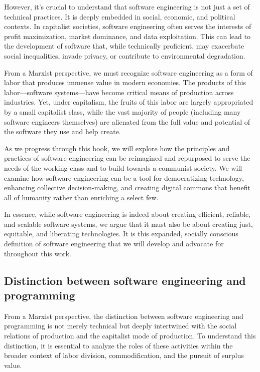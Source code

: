 \begin{refsection}
\begin{multicols}{2}
{However, it's crucial to understand that software engineering is not just a set of technical practices. It is deeply embedded in social, economic, and political contexts. In capitalist societies, software engineering often serves the interests of profit maximization, market dominance, and data exploitation. This can lead to the development of software that, while technically proficient, may exacerbate social inequalities, invade privacy, or contribute to environmental degradation.

From a Marxist perspective, we must recognize software engineering as a form of labor that produces immense value in modern economies. The products of this labor—software systems—have become critical means of production across industries. Yet, under capitalism, the fruits of this labor are largely appropriated by a small capitalist class, while the vast majority of people (including many software engineers themselves) are alienated from the full value and potential of the software they use and help create.

As we progress through this book, we will explore how the principles and practices of software engineering can be reimagined and repurposed to serve the needs of the working class and to build towards a communist society. We will examine how software engineering can be a tool for democratizing technology, enhancing collective decision-making, and creating digital commons that benefit all of humanity rather than enriching a select few.

In essence, while software engineering is indeed about creating efficient, reliable, and scalable software systems, we argue that it must also be about creating just, equitable, and liberating technologies. It is this expanded, socially conscious definition of software engineering that we will develop and advocate for throughout this work.
}

\subsection{Distinction between software engineering and programming}
{\small
From a Marxist perspective, the distinction between software engineering and programming is not merely technical but deeply intertwined with the social relations of production and the capitalist mode of production. To understand this distinction, it is essential to analyze the roles of these activities within the broader context of labor division, commodification, and the pursuit of surplus value.

}
\end{multicols}
\end{refsection}
